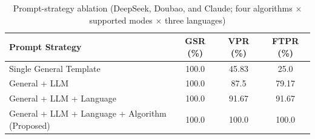 \documentclass[12pt]{llncs}
\begin{document}
\begin{table}[H]
  \centering
  \caption{Prompt-strategy ablation (DeepSeek, Doubao, and Claude; four algorithms $\times$ supported modes $\times$ three languages)}
  \label{tab:ablation_prompt}
  \setlength{\tabcolsep}{4pt}
  \begin{tabular}{l c c c}
    \toprule
    Prompt Strategy               & GSR (\%) & VPR (\%) & FTPR (\%) \\
    \midrule
    Single General Template       & 100.0    & 45.83    & 25.0      \\
    General + LLM                 & 100.0    & 87.5     & 79.17     \\
    General + LLM + Language      & 100.0    & 91.67    & 91.67     \\
    General + LLM + Language + Algorithm (Proposed) & 100.0 & 100.0 & 100.0 \\
    \bottomrule
  \end{tabular}
\end{table}


\end{document}
